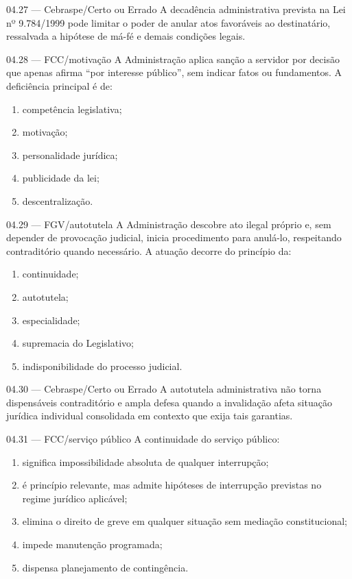 \begin{questao}{ 04.27 — Cebraspe/Certo ou Errado}
A decadência administrativa prevista na Lei nº 9.784/1999 pode limitar o poder de anular atos favoráveis ao destinatário, ressalvada a hipótese de má-fé e demais condições legais.
\end{questao}

\begin{questao}{ 04.28 — FCC/motivação}
A Administração aplica sanção a servidor por decisão que apenas afirma ``por interesse público'', sem indicar fatos ou fundamentos. A deficiência principal é de:
\begin{enumerate}[label=\Alph*)]
\item competência legislativa;
\item motivação;
\item personalidade jurídica;
\item publicidade da lei;
\item descentralização.
\end{enumerate}
\end{questao}

\begin{questao}{ 04.29 — FGV/autotutela}
A Administração descobre ato ilegal próprio e, sem depender de provocação judicial, inicia procedimento para anulá-lo, respeitando contraditório quando necessário. A atuação decorre do princípio da:
\begin{enumerate}[label=\Alph*)]
\item continuidade;
\item autotutela;
\item especialidade;
\item supremacia do Legislativo;
\item indisponibilidade do processo judicial.
\end{enumerate}
\end{questao}

\begin{questao}{ 04.30 — Cebraspe/Certo ou Errado}
A autotutela administrativa não torna dispensáveis contraditório e ampla defesa quando a invalidação afeta situação jurídica individual consolidada em contexto que exija tais garantias.
\end{questao}

\begin{questao}{ 04.31 — FCC/serviço público}
A continuidade do serviço público:
\begin{enumerate}[label=\Alph*)]
\item significa impossibilidade absoluta de qualquer interrupção;
\item é princípio relevante, mas admite hipóteses de interrupção previstas no regime jurídico aplicável;
\item elimina o direito de greve em qualquer situação sem mediação constitucional;
\item impede manutenção programada;
\item dispensa planejamento de contingência.
\end{enumerate}
\end{questao}

